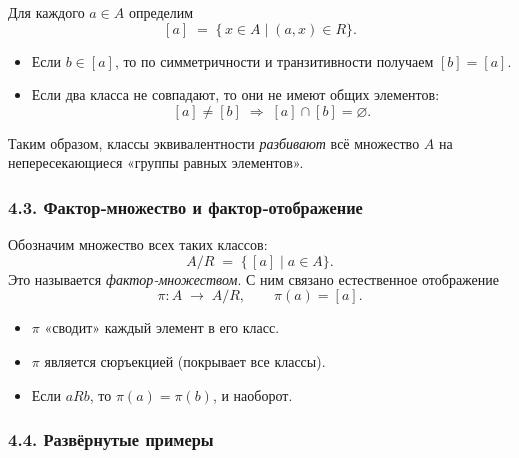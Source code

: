 Для каждого $a\in A$ определим
\[
  [a] \;=\; \{\,x\in A \mid (a,x)\in R\}.
\]
\begin{itemize}[leftmargin=*]
  \item Если $b\in[a]$, то по симметричности и транзитивности получаем $[b]=[a]$.
  \item Если два класса не совпадают, то они не имеют общих элементов:
    \[
      [a]\neq[b]\;\Longrightarrow\;[a]\cap[b]=\varnothing.
    \]
\end{itemize}

Таким образом, классы эквивалентности \emph{разбивают} всё множество $A$ на непересекающиеся «группы равных элементов».

\subsubsection{4.3. Фактор‑множество и фактор‑отображение}

Обозначим множество всех таких классов:
\[
  A/R \;=\; \{\, [a] \mid a\in A\}.
\]
Это называется \emph{фактор‑множеством}.  
С ним связано естественное отображение
\[
  \pi: A \;\longrightarrow\; A/R,\qquad
  \pi(a) = [a].
\]
\begin{itemize}[leftmargin=*]
  \item $\pi$ «сводит» каждый элемент в его класс.
  \item $\pi$ является сюръекцией (покрывает все классы).
  \item Если $aRb$, то $\pi(a)=\pi(b)$, и наоборот.
\end{itemize}

\subsubsection{4.4. Развёрнутые примеры}

